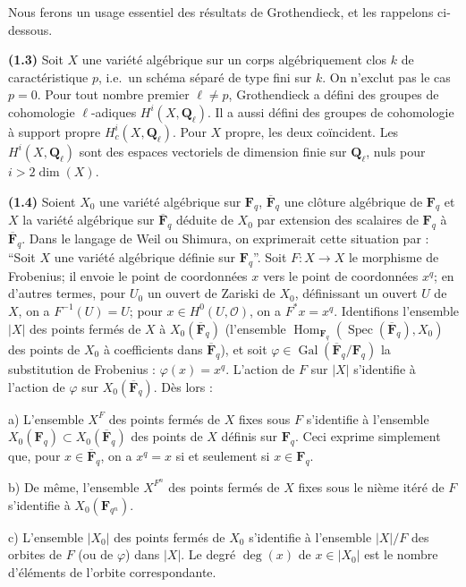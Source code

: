 \documentclass[12pt,a4paper]{amsart}
\theoremstyle{plain}
\theoremstyle{definition}
\theoremstyle{remark}
\DeclareMathOperator{\Gal}{Gal}
\DeclareMathOperator{\Hom}{Hom}
\DeclareMathOperator{\Spec}{Spec}
\newcommand{\Q}{\mathbf{Q}}
\newcommand{\F}{\mathbf{F}}
\numberwithin{equation}{section}
\begin{document}
Nous ferons un usage essentiel des r\'esultats de Grothendieck, et les rappelons ci-dessous.

\noindent \textbf{(1.3)} Soit $X$ une vari\'et\'e alg\'ebrique sur un corps alg\'ebriquement clos $k$ de caract\'eristique $p$, i.e.\ un sch\'ema s\'epar\'e de type fini sur $k$. On n'exclut pas le cas $p=0$. Pour tout nombre premier $\ell\not=p$, Grothendieck a d\'efini des groupes de cohomologie $\ell$-adiques $H^i(X,\Q_\ell)$. Il a aussi d\'efini des groupes de cohomologie \`a support propre $H^i_c(X,\Q_\ell)$. Pour $X$ propre, les deux co\"incident. Les $H^i(X,\Q_\ell)$ sont des espaces vectoriels de dimension finie sur $\Q_\ell$, nuls pour $i>2\dim(X)$.

\noindent \textbf{(1.4)} Soient $X_0$ une vari\'et\'e alg\'ebrique sur $\F_q$, $\overline{\F}_q$ une cl\^oture alg\'ebrique de $\F_q$ et $X$ la vari\'et\'e alg\'ebrique sur $\overline{\F}_q$ d\'eduite de $X_0$ par extension des scalaires de $\F_q$ \`a $\overline{\F}_q$. Dans le langage de Weil ou Shimura, on exprimerait cette situation par : ``Soit $X$ une vari\'et\'e alg\'ebrique d\'efinie sur $\F_q$''. Soit $F:X\to X$ le morphisme de Frobenius; il envoie le point de coordonn\'ees $x$ vers le point de coordonn\'ees $x^q$; en d'autres termes, pour $U_0$ un ouvert de Zariski de $X_0$, d\'efinissant un ouvert $U$ de $X$, on a $F^{-1}(U)=U$; pour $x\in H^0(U,\mathcal{O})$, on a $F^*x=x^q$. Identifions l'ensemble $|X|$ des points ferm\'es de $X$ \`a $X_0(\overline{\F}_q)$ (l'ensemble $\Hom_{\F_q}(\Spec(\overline{\F}_q),X_0)$ des points de $X_0$ \`a coefficients dans $\overline{\F}_q$), et soit $\varphi\in\Gal(\overline{\F}_q/\F_q)$ la substitution de Frobenius : $\varphi(x)=x^q$. L'action de $F$ sur $|X|$ s'identifie \`a l'action de $\varphi$ sur $X_0(\overline{\F}_q)$. D\`es lors :

a) L'ensemble $X^F$ des points ferm\'es de $X$ fixes sous $F$ s'identifie \`a l'ensemble $X_0(\F_q)\subset X_0(\overline{\F}_q)$ des points de $X$ d\'efinis sur $\F_q$. Ceci exprime simplement que, pour $x\in\overline{\F}_q$, on a $x^q=x$ si et seulement si $x\in\F_q$.

b) De m\^eme, l'ensemble $X^{F^n}$ des points ferm\'es de $X$ fixes sous le ni\`eme it\'er\'e de $F$ s'identifie \`a $X_0(\F_{q^n})$.

c) L'ensemble $|X_0|$ des points ferm\'es de $X_0$ s'identifie \`a l'ensemble $|X|/F$ des orbites de $F$ (ou de $\varphi$) dans $|X|$. Le degr\'e $\deg(x)$ de $x\in|X_0|$ est le nombre d'\'el\'ements de l'orbite correspondante.
\end{document}
